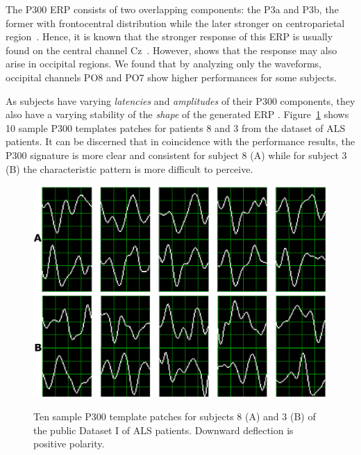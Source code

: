 The P300 ERP  consists of two overlapping components: the P3a and P3b, the former with frontocentral distribution while the later stronger on centroparietal region~\cite{Polich2007}. Hence, it is known that the stronger response of this ERP is usually found on the central channel Cz~\cite{Riccio2013}. However, \cite{Krusienski2006} shows that the response may also arise in occipital regions.  We found that by analyzing only the waveforms, occipital channels PO8 and PO7 show higher performances for some subjects. 


As subjects have varying \textit{latencies} and \textit{amplitudes} of their P300 components, they also have a varying stability of the \textit{shape} of the generated ERP \cite{Nam2010}.  Figure~\ref{fig:p300templates} shows 10 sample P300 templates patches for patients 8 and 3 from the dataset of ALS patients. It can be discerned that in coincidence with the performance results, the P300 signature is more clear and consistent for subject 8 (A) while for subject 3 (B) the characteristic pattern is more difficult to perceive.


\begin{figure}[h!]
\centering
\includegraphics[width=15cm]{images/subject.png}\label{subject8}
\caption[Sample P300 Patches]{Ten sample P300 template patches for subjects 8 (A) and 3 (B) of the public Dataset I of ALS patients.  Downward deflection is positive polarity. }
\label{fig:p300templates}
\end{figure}


